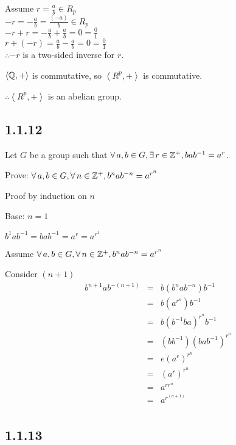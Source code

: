 \documentclass[letterpaper,12pt,fleqn]{article}
\newcommand{\bas}[2]{\left<#1,#2\right>}
\begin{document}
\begin{enumerate}[label=\alph*)]
  Assume $r=\frac{a}{b}\in R_p$ \\
  $-r=-\frac{a}{b}=\frac{(-a)}{b}\in R_p$ \\
  $-r+r=-\frac{a}{b}+\frac{a}{b}=0=\frac{0}{1}$ \\
  $r+(-r)=\frac{a}{b}-\frac{a}{b}=0=\frac{0}{1}$ \\
  $\therefore -r$ is a two-sided inverse for $r$.

  $\bas{\Q}{+}$ is commutative, so $\bas{R^p}{+}$ is commutative.

  $\therefore \bas{R^p}{+}$ is an abelian group.
\end{enumerate} 

\subsection*{1.1.12}

Let $G$ be a group such that $\forall\,a,b\in G,\exists\,r\in\mathbb{Z}^+,bab^{-1}=a^r$.

Prove: $\forall\,a,b\in G,\forall\,n\in\mathbb{Z}^+,b^nab^{-n}=a^{r^n}$

Proof by induction on $n$

\begin{description}
\item {Base: $n=1$}

  $b^1ab^{-1}=bab^{-1}=a^r=a^{r^1}$

\item Assume $\forall\,a,b\in G,\forall\,n\in\mathbb{Z}^+,b^nab^{-n}=a^{r^n}$

\item Consider $(n+1)$
  \begin{eqnarray*}
    b^{n+1}ab^{-(n+1)} &=& b(b^nab^{-n})b^{-1} \\
    &=& b(a^{r^n})b^{-1} \\
    &=& b(b^{-1}ba)^{r^n}b^{-1} \\
    &=& (bb^{-1})(bab^{-1})^{r^n} \\
    &=& e(a^r)^{r^n} \\
    &=& (a^r)^{r^n} \\
    &=& a^{rr^n} \\
    &=& a^{r^{(n+1)}} \\
  \end{eqnarray*}
\end{description}

\subsection*{1.1.13}
\end{document}
